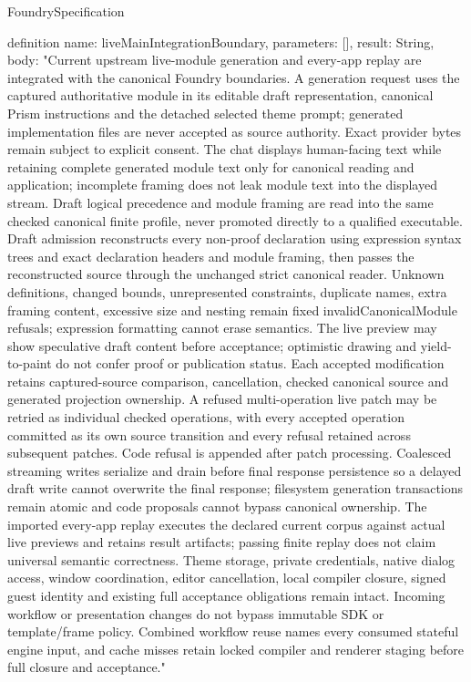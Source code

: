 \begin{lexlean}{FoundrySpecification}
\begin{semanticmodule}
definition{
  name: liveMainIntegrationBoundary,
  parameters: [],
  result: String,
  body: "Current upstream live-module generation and every-app replay are integrated with the canonical Foundry boundaries. A generation request uses the captured authoritative module in its editable draft representation, canonical Prism instructions and the detached selected theme prompt; generated implementation files are never accepted as source authority. Exact provider bytes remain subject to explicit consent. The chat displays human-facing text while retaining complete generated module text only for canonical reading and application; incomplete framing does not leak module text into the displayed stream. Draft logical precedence and module framing are read into the same checked canonical finite profile, never promoted directly to a qualified executable. Draft admission reconstructs every non-proof declaration using expression syntax trees and exact declaration headers and module framing, then passes the reconstructed source through the unchanged strict canonical reader. Unknown definitions, changed bounds, unrepresented constraints, duplicate names, extra framing content, excessive size and nesting remain fixed invalidCanonicalModule refusals; expression formatting cannot erase semantics. The live preview may show speculative draft content before acceptance; optimistic drawing and yield-to-paint do not confer proof or publication status. Each accepted modification retains captured-source comparison, cancellation, checked canonical source and generated projection ownership. A refused multi-operation live patch may be retried as individual checked operations, with every accepted operation committed as its own source transition and every refusal retained across subsequent patches. Code refusal is appended after patch processing. Coalesced streaming writes serialize and drain before final response persistence so a delayed draft write cannot overwrite the final response; filesystem generation transactions remain atomic and code proposals cannot bypass canonical ownership. The imported every-app replay executes the declared current corpus against actual live previews and retains result artifacts; passing finite replay does not claim universal semantic correctness. Theme storage, private credentials, native dialog access, window coordination, editor cancellation, local compiler closure, signed guest identity and existing full acceptance obligations remain intact. Incoming workflow or presentation changes do not bypass immutable SDK or template/frame policy. Combined workflow reuse names every consumed stateful engine input, and cache misses retain locked compiler and renderer staging before full closure and acceptance."
}


\end{semanticmodule}
\end{lexlean}
